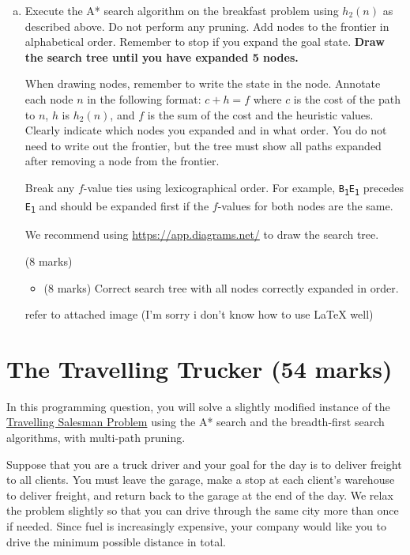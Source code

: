\documentclass[12pt]{article}
\begin{document}
\begin{enumerate}[(a)]
\item
\label{execute_a_star}
Execute the A* search algorithm on the breakfast problem using $h_2(n)$ as described above. Do not perform any pruning. Add nodes to the frontier in alphabetical order. Remember to stop if you expand the goal state. \textbf{Draw the search tree until you have expanded 5 nodes.}

When drawing nodes, remember to write the state in the node. Annotate each node $n$ in the following format: $c + h = f$ where $c$ is the cost of the path to $n$, $h$ is $h_2(n)$, and $f$ is the sum of the cost and the heuristic values. Clearly indicate which nodes you expanded and in what order. You do not need to write out the frontier, but the tree must show all paths expanded after removing a node from the frontier.

Break any $f$-value ties using lexicographical order. For example, \texttt{B\textsubscript{1}E\textsubscript{1}} precedes \texttt{E\textsubscript{1}} and should be expanded first if the $f$-values for both nodes are the same.

We recommend using \url{https://app.diagrams.net/} to draw the search tree.

\begin{markscheme} (8 marks)
\begin{itemize}
    \item (8 marks) Correct search tree with all nodes correctly expanded in order.
\end{itemize}
\end{markscheme}

\begin{sol}
{\color{blue} refer to attached image (I'm sorry i don't know how to use LaTeX well)}
\end{sol}

\end{enumerate}



\newpage
\section{The Travelling Trucker (54 marks)}

In this programming question, you will solve a slightly modified instance of the \href{https://en.wikipedia.org/wiki/Travelling_salesman_problem}{Travelling Salesman Problem} using the A* search and the breadth-first search algorithms, with multi-path pruning.

Suppose that you are a truck driver and your goal for the day is to deliver freight to all clients. You must leave the garage, make a stop at each client's warehouse to deliver freight, and return back to the garage at the end of the day. We relax the problem slightly so that you can drive through the same city more than once if needed. Since fuel is increasingly expensive, your company would like you to drive the minimum possible distance in total.
\end{document}
